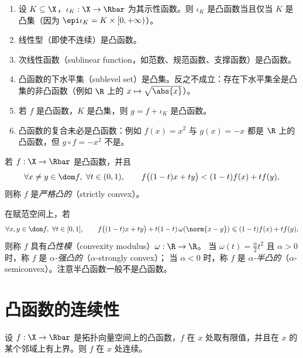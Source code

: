 \begin{example}
\label{exa:5}
\begin{enumerate}[label=\alph*.]
  \item 设 $K\subseteq\X$，$\iota_K:\X\to\Rbar$ 为其示性函数。则 $\iota_K$ 是凸函数当且仅当 $K$ 是凸集（因为 $\epi\iota_K=K\times[0,+\infty)$）。
  \item 线性型（即使不连续）是凸函数。
  \item 次线性函数（sublinear function，如范数、规范函数、支撑函数）是凸函数。
  \item 凸函数的下水平集（sublevel set）是凸集。反之不成立：存在下水平集全是凸集的非凸函数（例如 $\R$ 上的 $x\mapsto\sqrt{\abs{x}}$）。
  \item 若 $f$ 是凸函数，$K$ 是凸集，则 $g=f+\iota_K$ 是凸函数。
  \item 凸函数的复合未必是凸函数：例如 $f(x)=x^2$ 与 $g(x)=-x$ 都是 $\R$ 上的凸函数，但 $g\circ f=-x^2$ 不是。
\end{enumerate}
\end{example}

\begin{definition}
\label{def:13}
若 $f:\X\to\Rbar$ 是凸函数，并且
\begin{equation}
  \label{eq:5}
  \forall x\neq y\in\dom f,\ \forall t\in(0,1),\qquad
  f\bigl((1-t)x+ty\bigr)<(1-t)f(x)+tf(y),
\end{equation}
则称 $f$ 是\emph{严格凸的}（strictly convex）。

在赋范空间上，若
\begin{equation}
  \label{eq:6}
  \forall x,y\in\dom f,\ \forall t\in[0,1],\qquad
  f\bigl((1-t)x+ty\bigr)+t(1-t)\,\omega(\norm{x-y})\leqslant(1-t)f(x)+tf(y),
\end{equation}
则称 $f$ 具有\emph{凸性模}（convexity modulus）$\omega:\R\to\R$。
当 $\omega(t)=\frac{\alpha}{2}t^2$ 且 $\alpha>0$ 时，称 $f$ 是 \emph{$\alpha$-强凸的}（$\alpha$-strongly convex）；
当 $\alpha<0$ 时，称 $f$ 是 \emph{$\alpha$-半凸的}（$\alpha$-semiconvex）。注意半凸函数一般不是凸函数。
\end{definition}

\section{凸函数的连续性}

\begin{proposition}
\label{res:17}
设 $f:\X\to\Rbar$ 是拓扑向量空间上的凸函数，$f$ 在 $x$ 处取有限值，并且在 $x$ 的某个邻域上有上界。则 $f$ 在 $x$ 处连续。
\end{proposition}

